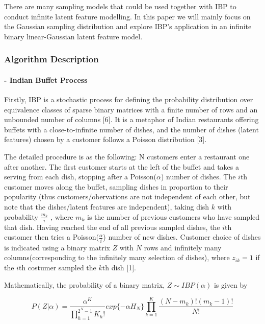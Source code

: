 \documentclass[11pt]{article}
\begin{document}
There are many sampling models that could be used together with IBP to
conduct infinite latent feature modelling. In this paper we will mainly
focus on the Gaussian sampling distribution and explore IBP's
application in an infinite binary linear-Gaussian latent feature model.

    \hypertarget{algorithm-description}{%
\subsubsection{Algorithm Description}\label{algorithm-description}}

    \hypertarget{indian-buffet-process}{%
\paragraph{- Indian Buffet Process}\label{indian-buffet-process}}

Firstly, IBP is a stochastic process for defining the probability
distribution over equivalence classes of sparse binary matrices with a
finite number of rows and an unbounded number of columns {[}6{]}. It is
a metaphor of Indian restaurants offering buffets with a
close-to-infinite number of dishes, and the number of dishes (latent
features) chosen by a customer follows a Poisson distribution {[}3{]}.

The detailed procedure is as the following: N customers enter a
restaurant one after another. The first customer starts at the left of
the buffet and takes a serving from each dish, stopping after a
Poisson(\(\alpha\)) number of dishes. The \(i\)th customer moves along
the buffet, sampling dishes in proportion to their popularity (thus
customers/obervations are not independent of each other, but note that
the dishes/latent features are independent), taking dish \(k\) with
probability \(\frac{m_k}{i}\) , where \(m_k\) is the number of previous
customers who have sampled that dish. Having reached the end of all
previous sampled dishes, the \(i\)th customer then tries a
Poisson(\(\frac{\alpha}{i}\)) number of new dishes. Customer choice of
dishes is indicated using a binary matrix \(Z\) with \(N\) rows and
infinitely many columns(corresponding to the infinitely many selection
of dishes), where \(z_{ik} = 1\) if the \(i\)th costumer sampled the
\(k\)th dish {[}1{]}.

Mathematically, the probability of a binary matrix,
\(Z \sim IBP(\alpha)\) is given by

\[P(Z| \alpha) = \frac{\alpha^{K}}{\prod_{h=1}^{2^N - 1} K_{h}!} exp \{ - \alpha H_{N}\} \prod_{k=1}^{K} \frac{(N- m_k)! (m_k - 1)!}{N!}\]
\end{document}
